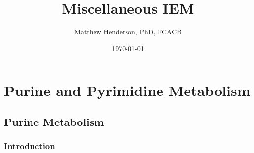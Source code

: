 \documentclass{scrartcl}
\author{Matthew Henderson, PhD, FCACB}
\date{\today}
\title{Miscellaneous IEM}
\begin{document}
\maketitle
\setcounter{tocdepth}{2}
\tableofcontents


\section{Purine and Pyrimidine Metabolism}
\label{sec:orgdf1a14a}
\subsection{Purine Metabolism}
\label{sec:org679ed72}
\subsubsection{Introduction}
\label{sec:org62ade3f}
\end{document}
